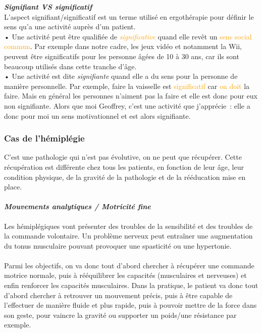 	\textbf{\emph{Signifiant VS significatif}\\}
L’aspect signifiant/significatif est un terme utilisé en ergothérapie pour définir le sens qu'a une activité auprès d’un patient.\\
• Une activité peut être qualifiée de \emph{\textcolor{orange}{significative}} quand elle revêt un \textcolor{orange}{sens social commun}. Par exemple dans notre cadre, les jeux vidéo et notamment la Wii, peuvent être significatifs pour les personne âgées de 10 à 30 ans, car ils sont beaucoup utilisés dans cette tranche d'âge.\\
• Une activité est dite \emph{\textcolor{vert}{signifiante}} quand elle a du sens pour la personne de \textcolor{vert}{manière personnelle}. Par exemple, faire la vaisselle est \textcolor{orange}{significatif }car \textcolor{orange}{on doit} la faire. Mais en général les personnes n’aiment pas la faire et elle est donc pour eux non signifiante. Alors que \textcolor{vert}{moi} Geoffrey, c'est une activité que \textcolor{vert}{j'}apprécie~:  elle a donc pour moi un \textcolor{vert}{sens motivationnel} et est alors \textcolor{vert}{signifiante}.

	\subsubsection{Cas de l'hémiplégie}
C’est une pathologie qui n’est pas évolutive, on ne peut que récupérer. Cette récupération est différente chez tous les patients, en fonction de leur âge, leur condition physique, de la gravité de la pathologie et de la rééducation mise en place.

\paragraph{\emph{Mouvements analytiques / Motricité fine} \\ }
Les hémiplégiques vont présenter des troubles de la sensibilité et des troubles de la commande volontaire. Un problème nerveux peut entraîner une augmentation du tonus musculaire pouvant provoquer une spasticité ou une hypertonie. 

\paragraph{}
Parmi les objectifs, on va donc tout d’abord chercher à récupérer une commande motrice normale, puis à rééquilibrer les capacités (musculaires et nerveuses) et enfin renforcer les capacités musculaires. Dans la pratique, le patient va donc tout d’abord chercher à retrouver un mouvement précis, puis à être capable de l’effectuer de manière fluide et plus rapide, puis à pouvoir mettre de la force dans son geste, pour vaincre la gravité ou supporter un poids/une résistance par exemple.

